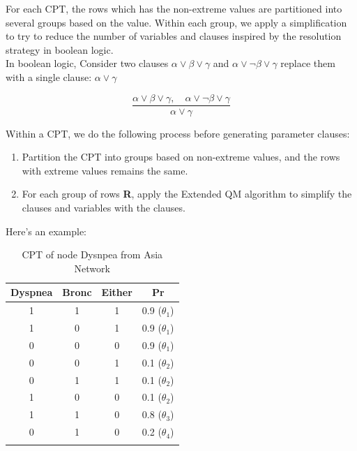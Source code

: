         For each CPT, the rows which has the non-extreme values are partitioned into several groups based on the value. Within each group, we apply a simplification to try to reduce the number of variables and clauses inspired by the resolution strategy in boolean logic.\\
        
        In boolean logic, Consider two clauses $\alpha \vee \beta \vee \gamma$  and $\alpha \vee \neg\beta \vee \gamma$
        replace them with a single clause: $\alpha \vee \gamma$
        
        $$\frac{ \alpha \vee \beta \vee \gamma, \quad \alpha \vee \neg\beta \vee \gamma}{\alpha \vee \gamma}$$
        
        Within a CPT, we do the following process before generating parameter clauses:\\
        \begin{enumerate}
            \item Partition the CPT into groups based on non-extreme values, and the rows with extreme values remains the same.
            \item For each group of rows \textbf{R}, apply the Extended QM algorithm to simplify the clauses and variables with the clauses.\\
        \end{enumerate}
        
        
        Here's an example:\\
        \begin{table}[ht]
        \centering
        \begin{tabular}{c c c c}
            \hline
            \hline
            Dyspnea & Bronc & Either & Pr\\
            \hline
            \hline
            1 & 1 & 1 & 0.9 ($\theta_{1}$) \\
            1 & 0 & 1 & 0.9 ($\theta_{1}$)\\
            0 & 0 & 0 & 0.9 ($\theta_{1}$)\\
            0 & 0 & 1 & 0.1 ($\theta_{2}$)\\
            0 & 1 & 1 & 0.1 ($\theta_{2}$)\\
            1 & 0 & 0 & 0.1 ($\theta_{2}$)\\
            1 & 1 & 0 & 0.8 ($\theta_{3}$)\\
            0 & 1 & 0 & 0.2 ($\theta_{4}$)\\
            \hline
        \label{table:nyspnea_asia}
        \end{tabular}
        \caption{CPT of node Dysnpea from Asia Network}
        \end{table}
        
